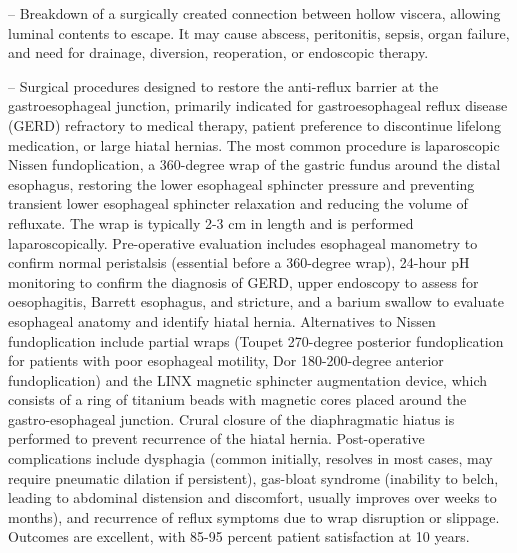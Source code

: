 -- Breakdown of a surgically created connection between hollow viscera, allowing luminal contents to escape. It may cause abscess, peritonitis, sepsis, organ failure, and need for drainage, diversion, reoperation, or endoscopic therapy.

-- Surgical procedures designed to restore the anti-reflux barrier at the gastroesophageal junction, primarily indicated for gastroesophageal reflux disease (GERD) refractory to medical therapy, patient preference to discontinue lifelong medication, or large hiatal hernias. The most common procedure is laparoscopic Nissen fundoplication, a 360-degree wrap of the gastric fundus around the distal esophagus, restoring the lower esophageal sphincter pressure and preventing transient lower esophageal sphincter relaxation and reducing the volume of refluxate. The wrap is typically 2-3 cm in length and is performed laparoscopically. Pre-operative evaluation includes esophageal manometry to confirm normal peristalsis (essential before a 360-degree wrap), 24-hour pH monitoring to confirm the diagnosis of GERD, upper endoscopy to assess for oesophagitis, Barrett esophagus, and stricture, and a barium swallow to evaluate esophageal anatomy and identify hiatal hernia. Alternatives to Nissen fundoplication include partial wraps (Toupet 270-degree posterior fundoplication for patients with poor esophageal motility, Dor 180-200-degree anterior fundoplication) and the LINX magnetic sphincter augmentation device, which consists of a ring of titanium beads with magnetic cores placed around the gastro-esophageal junction. Crural closure of the diaphragmatic hiatus is performed to prevent recurrence of the hiatal hernia. Post-operative complications include dysphagia (common initially, resolves in most cases, may require pneumatic dilation if persistent), gas-bloat syndrome (inability to belch, leading to abdominal distension and discomfort, usually improves over weeks to months), and recurrence of reflux symptoms due to wrap disruption or slippage. Outcomes are excellent, with 85-95 percent patient satisfaction at 10 years.


